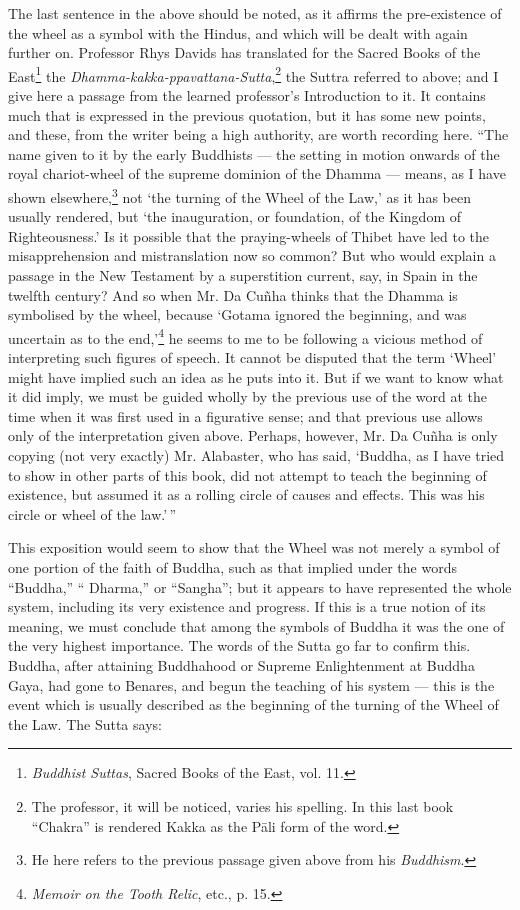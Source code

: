 \documentclass[a4paper, 11pt, oneside, polutonikogreek, english]{article}
\begin{document}
The last sentence in the above should be noted, as it affirms the pre-existence of the wheel as a symbol with the Hindus, and which will be dealt with again further on. Professor Rhys Davids has translated for the Sacred Books of the East\footnote{\emph{Buddhist Suttas}, Sacred Books of the East, vol. 11.} the \emph{Dhamma-kakka-ppavattana-Sutta},\footnote{The professor, it will be noticed, varies his spelling. In this last book ``Chakra'' is rendered Kakka as the Pāli form of the word.} the Suttra referred to above; and I give here a passage from the learned professor's Introduction to it. It contains much that is expressed in the previous quotation, but it has some new points, and these, from the writer being a high authority, are worth recording here. ``The name given to it by the early Buddhists --- the setting in motion onwards of the royal chariot-wheel of the supreme dominion of the Dhamma --- means, as I have shown elsewhere,\footnote{He here refers to the previous passage given above from his \emph{Buddhism}.} not `the turning of the Wheel of the Law,' as it has been usually rendered, but `the inauguration, or foundation, of the Kingdom of Righteousness.' Is it possible that the praying-wheels of Thibet have led to the misapprehension and mistranslation now so common? But who would explain a passage in the New Testament by a superstition current, say, in Spain in the twelfth century? And so when Mr. Da Cuñha thinks that the Dhamma is symbolised by the wheel, because `Gotama ignored the beginning, and was uncertain as to the end,'\footnote{\emph{Memoir on the Tooth Relic}, etc., p. 15.} he seems to me to be following a vicious method of interpreting such figures of speech. It cannot be disputed that the term `Wheel' might have implied such an idea as he puts into it. But if we want to know what it did imply, we must be guided wholly by the previous use of the word at the time when it was first used in a figurative sense; and that previous use allows only of the interpretation given above. Perhaps, however, Mr. Da Cuñha is only copying (not very exactly) Mr. Alabaster, who has said, `Buddha, as I have tried to show in other parts of this book, did not attempt to teach the beginning of existence, but assumed it as a rolling circle of causes and effects. This was his circle or wheel of the law.'\,''

This exposition would seem to show that the Wheel was not merely a symbol of one portion of the faith of Buddha, such as that implied under the words ``Buddha,'' `` Dharma,'' or ``Sangha''; but it appears to have represented the whole system, including its very existence and progress. If this is a true notion of its meaning, we must conclude that among the symbols of Buddha it was the one of the very highest importance. The words of the Sutta go far to confirm this. Buddha, after attaining Buddhahood or Supreme Enlightenment at Buddha Gaya, had gone to Benares, and begun the teaching of his system --- this is the event which is usually described as the beginning of the turning of the Wheel of the Law. The Sutta says: 
\end{document}
